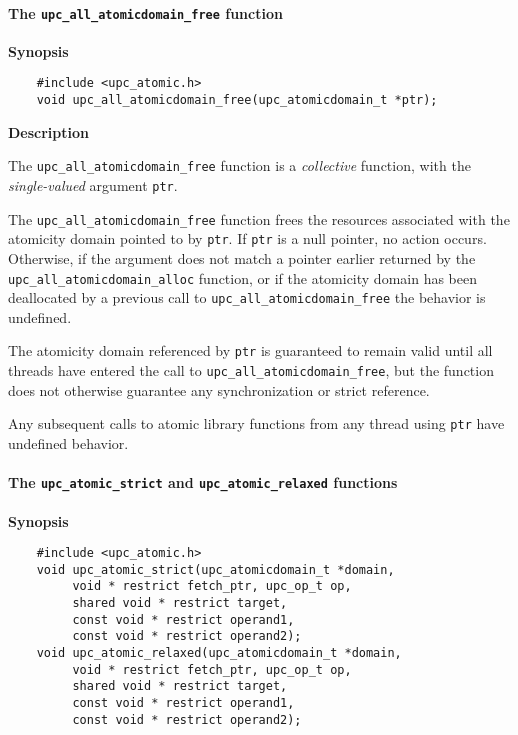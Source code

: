 \paragraph{The {\tt upc\_all\_atomicdomain\_free} function}

{\bf Synopsis}

\npf\vspace{-1.8em}
\begin{verbatim}
    #include <upc_atomic.h>
    void upc_all_atomicdomain_free(upc_atomicdomain_t *ptr);
\end{verbatim}

{\bf Description}

\np The {\tt upc\_all\_atomicdomain\_free} function is a {\em collective} function,
    with the {\em single-valued} argument {\tt ptr}.

\np The {\tt upc\_all\_atomicdomain\_free} function frees the resources associated with
    the atomicity domain pointed to by {\tt ptr}.  If {\tt ptr} is a null pointer,
    no action occurs.  Otherwise, if the argument does not match a pointer
    earlier returned by the {\tt upc\_all\_atomicdomain\_alloc} function, or if
    the atomicity domain has been deallocated by a previous call to
    {\tt upc\_all\_atomicdomain\_free} the behavior is undefined.

\np The atomicity domain referenced by {\tt ptr} is guaranteed to remain valid
    until all threads have entered the call to {\tt upc\_all\_atomicdomain\_free},
    but the function does not otherwise guarantee any synchronization or
    strict reference.

\np Any subsequent calls to atomic library functions from any thread using {\tt ptr} have
    undefined behavior.

\paragraph{The {\tt upc\_atomic\_strict} and {\tt upc\_atomic\_relaxed} functions}

{\bf Synopsis}

\npf\vspace{-1.8em}
\begin{verbatim}
    #include <upc_atomic.h>
    void upc_atomic_strict(upc_atomicdomain_t *domain,
         void * restrict fetch_ptr, upc_op_t op,
         shared void * restrict target,
         const void * restrict operand1,
         const void * restrict operand2);
    void upc_atomic_relaxed(upc_atomicdomain_t *domain,
         void * restrict fetch_ptr, upc_op_t op,
         shared void * restrict target,
         const void * restrict operand1,
         const void * restrict operand2);
\end{verbatim}

